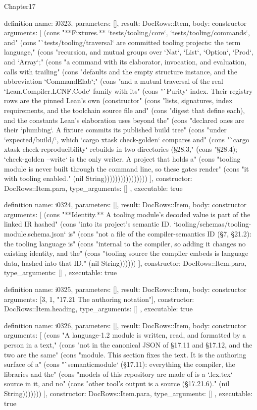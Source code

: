 \begin{lexlean}{Chapter17}
\begin{semanticmodule}
definition{
  name: i0323,
  parameters: [],
  result: DocRows::Item,
  body: constructor{
    arguments: [
      (cons "**Fixtures.** `tests/tooling/core`, `tests/tooling/commands`, and" (cons "`tests/tooling/traversal` are committed tooling projects: the term language," (cons "recursion, and mutual groups over `Nat`, `List`, `Option`, `Prod`, and `Array`;" (cons "a command with its elaborator, invocation, and evaluation, calls with trailing" (cons "defaults and the empty structure instance, and the abbreviation `CommandElab`;" (cons "and a mutual traversal of the real `Lean.Compiler.LCNF.Code` family with its" (cons "`Purity` index. Their registry rows are the pinned Lean's own (constructor" (cons "lists, signatures, index requirements, and the toolchain source file and" (cons "digest that define each), and the constants Lean's elaboration uses beyond the" (cons "declared ones are their `plumbing`. A fixture commits its published build tree" (cons "under `expected/build/`, which `cargo xtask check-golden` compares and" (cons "`cargo xtask check-reproducibility` rebuilds in two directories (§28.3," (cons "§28.4); `check-golden --write` is the only writer. A project that holds a" (cons "tooling module is never built through the command line, so these gates render" (cons "it with tooling enabled." (nil String))))))))))))))))
    ],
    constructor: DocRows::Item.para,
    type_arguments: []
  },
  executable: true
}

definition{
  name: i0324,
  parameters: [],
  result: DocRows::Item,
  body: constructor{
    arguments: [
      (cons "**Identity.** A tooling module's decoded value is part of the linked IR hashed" (cons "into its project's semantic ID. `tooling/schemas/tooling-module.schema.json` is" (cons "not a file of the compiler-semantics ID (§7, §21.2): the tooling language is" (cons "internal to the compiler, so adding it changes no existing identity, and the" (cons "tooling source the compiler embeds is language data, hashed into that ID." (nil String))))))
    ],
    constructor: DocRows::Item.para,
    type_arguments: []
  },
  executable: true
}

definition{
  name: i0325,
  parameters: [],
  result: DocRows::Item,
  body: constructor{
    arguments: [3, 1, "17.21 The authoring notation"],
    constructor: DocRows::Item.heading,
    type_arguments: []
  },
  executable: true
}

definition{
  name: i0326,
  parameters: [],
  result: DocRows::Item,
  body: constructor{
    arguments: [
      (cons "A language-1.2 module is written, read, and formatted by a person in a text," (cons "not in the canonical JSON of §17.11 and §17.12, and the two are the same" (cons "module. This section fixes the text. It is the authoring surface of a" (cons "`semanticmodule` (§17.11): everything the compiler, the libraries and the" (cons "models of this repository are made of is a `.lex.tex` source in it, and no" (cons "other tool's output is a source (§17.21.6)." (nil String)))))))
    ],
    constructor: DocRows::Item.para,
    type_arguments: []
  },
  executable: true
}


\end{semanticmodule}
\end{lexlean}
